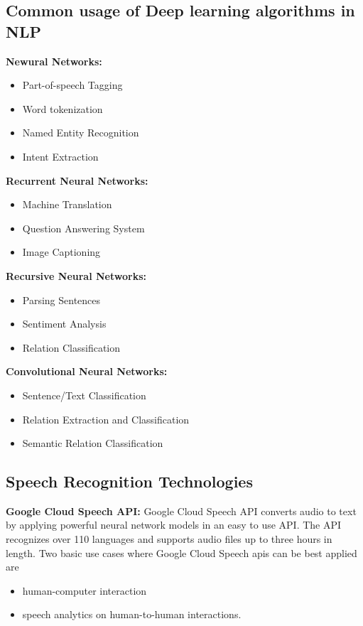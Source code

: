 \documentclass[sigconf]{acmart}
\begin{document}
\subsection{Common usage of Deep learning algorithms in NLP}
\par\null\par
\textbf{Newural Networks:}
  \begin{itemize} 
    \item Part-of-speech Tagging
    \item Word tokenization
    \item Named Entity Recognition
    \item Intent Extraction
  \end{itemize} 
\textbf{Recurrent Neural Networks:}
  \begin{itemize} 
    \item Machine Translation
    \item Question Answering System
    \item Image Captioning
  \end{itemize} 
\textbf{Recursive Neural Networks:}
  \begin{itemize} 
    \item Parsing Sentences
    \item Sentiment Analysis
    \item Relation Classification
  \end{itemize} 
\textbf{Convolutional Neural Networks:}
  \begin{itemize} 
    \item Sentence/Text Classification
    \item Relation Extraction and Classification
    \item Semantic Relation Classification
  \end{itemize} 
\subsection{Speech Recognition Technologies}     
\textbf{Google Cloud Speech API:} Google Cloud Speech API \cite{GoogleSpeech} converts audio to text by applying powerful neural network models in an easy to use API. The API recognizes over 110 languages and supports audio files up to three hours in length. Two basic use cases where Google Cloud Speech apis can be best applied are
  \begin{itemize}
  \item human-computer interaction 
  \item speech analytics on human-to-human interactions.
  \end{itemize} 
\end{document}
